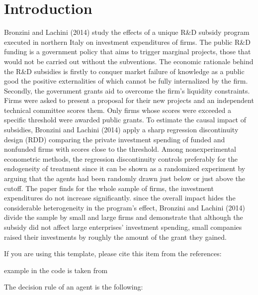 \documentclass[11pt, a4paper, leqno]{article}
\begin{document}
\section{Introduction} %
\label{sec:introduction}
Bronzini and Lachini (2014) study the effects of a unique R\&D subsidy program
executed in northern Italy on investment expenditures of firms.
The public R\&D funding is a government policy that aims to trigger marginal projects,
those that would not be carried out without the subventions. The economic rationale
behind the R\&D subsidies is firstly to conquer market failure of knowledge as a
public good the positive externalities of which cannot be fully internalized by the
firm. Secondly, the government grants aid to overcome the firm's liquidity
constraints. Firms were asked to present a proposal for their new projects and
an independent technical committee scores them. Only firms whose scores were exceeded
a specific threshold were awarded public grants. To estimate the causal impact of
subsidies, Bronzini and Lachini (2014) apply a sharp regression discontinuity design
(RDD) comparing the private investment spending of funded and nonfunded firms with
scores close to the threshold. Among nonexperimental econometric methods, the
regression discontinuity controls preferably for the endogeneity of treatment since
it can be shown as a randomized experiment by arguing that the agents had been
randomly drawn just below or just above the cutoff. The paper finds for the whole
sample of firms, the investment expenditures do not increase significantly.
since the overall impact hides the considerable heterogeneity in the program’s effect,
Bronzini and Lachini (2014) divide the sample by small and large firms and demonstrate
that although the subsidy did not affect large enterprises' investment spending,
small companies raised their investments by roughly the amount of the grant they
gained.


If you are using this template, please cite this item from the references: \citet{GaudeckerEconProjectTemplates}

\citet{Schelling69} example in the code is taken from \citet{StachurskiSargent13}

The decision rule of an agent is the following:

\end{document}
